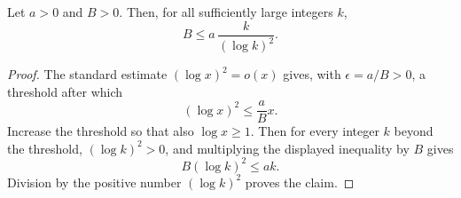 \begin{helper}
Let \(a>0\) and \(B>0\).  Then, for all sufficiently large integers \(k\),
\[
  B\le a\,\frac{k}{(\log k)^2}.
\]
\end{helper}
\begin{proof}
The standard estimate \((\log x)^2=o(x)\) gives, with
\(\epsilon=a/B>0\), a threshold after which
\[
  (\log x)^2\le \frac aB x.
\]
Increase the threshold so that also \(\log x\ge1\).  Then for every integer
\(k\) beyond the threshold, \((\log k)^2>0\), and multiplying the displayed
inequality by \(B\) gives
\[
  B(\log k)^2\le ak.
\]
Division by the positive number \((\log k)^2\) proves the claim.
\end{proof}

